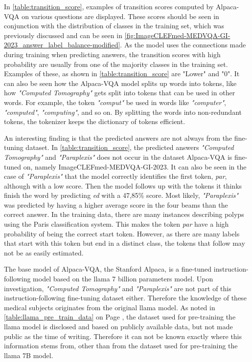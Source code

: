    In \autoref{table:transition_score}, examples of transition scores computed by Alpaca-VQA on various questions are displayed.
    These scores should be seen in conjunction with the distribution of classes in the training set, which was previously discussed and can be seen in \autoref{fig:ImageCLEFmed-MEDVQA-GI-2023_answer_label_balance-modified}. 
    As the model uses the connections made during training when predicting answers, the transition scores with high probability are usually from one of the majority classes in the training set. Examples of these, as shown in \autoref{table:transition_score} are "Lower" and "0". 
    It can also be seen how the Alpaca-VQA model splits up words into tokens, like how \textit{"Computed Tomography"} gets split into tokens that can be used in other words. For example, the token \textit{"comput"} be used in words like \textit{"computer"}, \textit{"computed"}, \textit{"computing"}, and so on. By splitting the words into non-redundant tokens, the tokenizer keeps the dictionary of tokens efficient. 

    An interesting finding is that the predicted answers are not always from the fine-tuning dataset. In \autoref{table:transition_score}, the predicted answers \textit{"Computed Tomography"} and \textit{"Paraplexis"} does not occur in the dataset Alpaca-VQA is fine-tuned on, namely ImageCLEFmed-MEDVQA-GI-2023. 
    It can also be seen in the case of \textit{"Paraplexis"} that the model correctly identifies the first token, \textit{par}, although with a low score. Then the model follows up with the tokens it thinks finish the word by predicting \textit{ed} with a 47,85\% score. Most likely, \textit{"Paraplexis"} was predicted by having a higher average score in the four beams than the correct answer.
    In the training data, there are many instances describing polyps using the Paris classification system. This makes the token \textit{par} have a high probability of being the correct start token. However, as there are many labels that start with this token but end in a distinct class, the tokens that follow may not be as easily estimated. 
    
    The base model of Alpaca-VQA, the Stanford Alpaca, is a fine-tuned instruction-following model based on the \gls{llama} 7 billion parameters model. Upon investigation, \textit{"Computed Tomography"} and \textit{"Paraplexis"} are not part of this instruction-following fine-tuning dataset either. Therefore the knowledge of these medical subjects originates from the original \gls{llama} model. As noted in \autoref{table:llama_pre_train_data} on Page \pageref{table:llama_pre_train_data}, the dataset used for pre-training the \gls{llama} model is disclosed and based on publicly available data, but not made public as the time of writing. Therefore it can not be known exactly where this information stems from, other than from the dataset used for pre-training the \gls{llama} 7B model.


